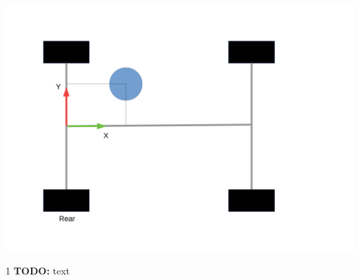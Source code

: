 \documentclass[12pt]{article} %
\def\printtodos{0}
\newcommand{\todo}[1]{
  \if\printtodos1
      {\color{red} \textbf{TODO:} #1}
  \fi}
\begin{document}
\noindent\begin{minipage}{0.5\textwidth}
  \noindent \includegraphics[width=\textwidth]{./pictures/gps_antenna_offset.pdf}
\end{minipage}
\begin{minipage}{0.5\textwidth} %
  \todo{text}
\end{minipage}




\end{document}
